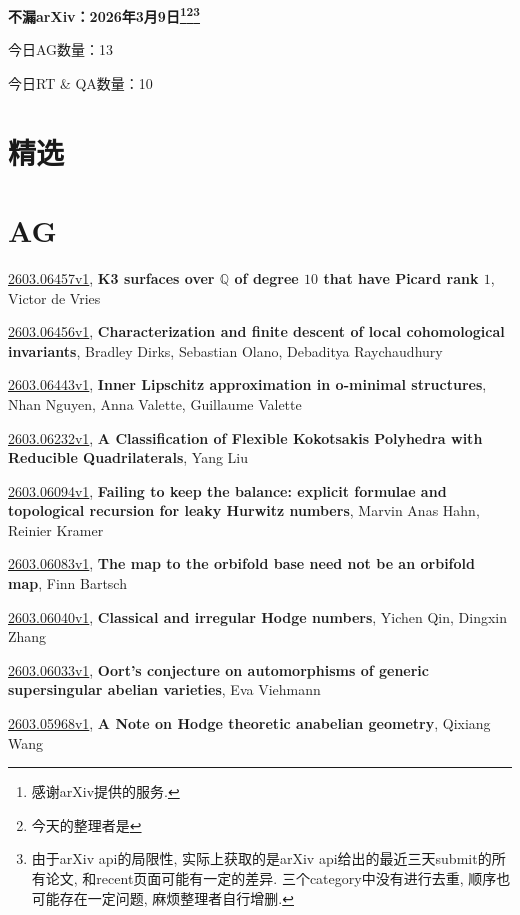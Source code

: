 \documentclass[9pt, a4paper]{article}
\theoremstyle{plain}
\theoremstyle{definition}
\theoremstyle{remark}
\newcommand{\arxiv}[3]{\href{https://arxiv.org/abs/#1}{#1}, \textbf{\textcolor{arxivblue}{#2}}, #3}
\newcommand{\AGnumber}{13}
\newcommand{\RTQAnumber}{10}
\newcommand{\NewestDate}{2026年3月9日}
\newcommand{\todayarXiver}{} %
\begin{document}
\begin{center}
    \Huge\textbf{不漏arXiv：\NewestDate\footnote{感谢arXiv提供的服务.}\footnote{今天的整理者是\todayarXiver}\footnote{由于arXiv api的局限性, 实际上获取的是arXiv api给出的最近三天submit的所有论文, 和recent页面可能有一定的差异. 三个category中没有进行去重, 顺序也可能存在一定问题, 麻烦整理者自行增删.}} \\
\end{center}

\setcounter{section}{-1}

\begin{center}
    今日AG数量：\AGnumber
    
    今日RT \& QA数量：\RTQAnumber
    
\end{center}


\section{精选}


\section{AG}
\arxiv{2603.06457v1}{K3 surfaces over $\mathbb{Q}$ of degree $10$ that have Picard rank $1$}{Victor de Vries}

\arxiv{2603.06456v1}{Characterization and finite descent of local cohomological invariants}{Bradley Dirks, Sebastian Olano, Debaditya Raychaudhury}

\arxiv{2603.06443v1}{Inner Lipschitz approximation in o-minimal structures}{Nhan Nguyen, Anna Valette, Guillaume Valette}

\arxiv{2603.06232v1}{A Classification of Flexible Kokotsakis Polyhedra with Reducible Quadrilaterals}{Yang Liu}

\arxiv{2603.06094v1}{Failing to keep the balance: explicit formulae and topological recursion for leaky Hurwitz numbers}{Marvin Anas Hahn, Reinier Kramer}

\arxiv{2603.06083v1}{The map to the orbifold base need not be an orbifold map}{Finn Bartsch}

\arxiv{2603.06040v1}{Classical and irregular Hodge numbers}{Yichen Qin, Dingxin Zhang}

\arxiv{2603.06033v1}{Oort's conjecture on automorphisms of generic supersingular abelian varieties}{Eva Viehmann}

\arxiv{2603.05968v1}{A Note on Hodge theoretic anabelian geometry}{Qixiang Wang}
\end{document}

